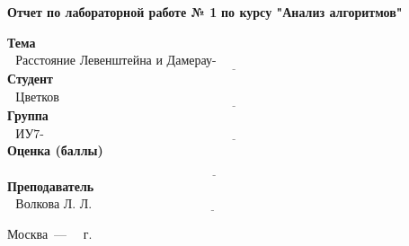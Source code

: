 \begin{titlepage}
	
	\begin{center}
		\Large\textbf{Отчет по лабораторной работе № 1}
		\Large\textbf{по курсу "Анализ алгоритмов"}\newline
	\end{center}
	
	\noindent\textbf{Тема} $\underline{\text{~~Расстояние Левенштейна и Дамерау-Левенштейна~~~~~~~~~~~~~~~~~~~~~~~~~~~~~~~~~~~~~~~~~~~}}$\newline\newline
	\noindent\textbf{Студент} $\underline{\text{~~Цветков И.А.~~~~~~~~~~~~~~~~~~~~~~~~~~~~~~~~~~~~~~~~~~~~~~~~~~~~~~~~~~~~~~~~~~~~~~~~~~~~~~~~~~~~~~~~~}}$\newline\newline
	\noindent\textbf{Группа} $\underline{\text{~~ИУ7-53Б~~~~~~~~~~~~~~~~~~~~~~~~~~~~~~~~~~~~~~~~~~~~~~~~~~~~~~~~~~~~~~~~~~~~~~~~~~~~~~~~~~~~~~~~~~~~~~~~~}}$\newline\newline
	\noindent\textbf{Оценка (баллы)} $\underline{\text{~~~~~~~~~~~~~~~~~~~~~~~~~~~~~~~~~~~~~~~~~~~~~~~~~~~~~~~~~~~~~~~~~~~~~~~~~~~~~~~~~~~~~~~~~~~~~~~~~~~}}$\newline\newline
	\noindent\textbf{Преподаватель} $\underline{\text{~~Волкова Л. Л.~~~~~~~~~~~~~~~~~~~~~~~~~~~~~~~~~~~~~~~~~~~~~~~~~~~~~~~~~~~~~~~~~~~~~~~~~~~~~~}}$\newline
	
	\begin{center}
		\vfill
		Москва~---~\the\year
		~г.
	\end{center}
	\restoregeometry
\end{titlepage}

